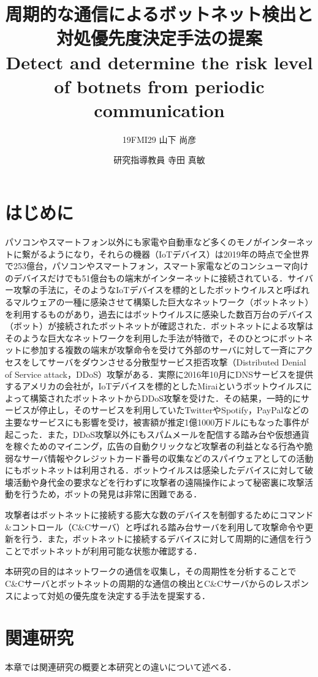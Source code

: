 \documentclass[twocolumn]{ltjsarticle}
\title{
  周期的な通信によるボットネット検出と対処優先度決定手法の提案  \\
  Detect and determine the risk level of botnets from periodic communication
}
\author{19FMI29 山下 尚彦 \and 研究指導教員 寺田 真敏}
\date{}
\begin{document}
\fontsize{9}{9}\selectfont
\maketitle

\section{はじめに}
パソコンやスマートフォン以外にも家電や自動車など多くのモノがインターネットに繋がるようになり，それらの機器（IoTデバイス）は2019年の時点で全世界で253億台，パソコンやスマートフォン，スマート家電などのコンシューマ向けのデバイスだけでも51億台もの端末がインターネットに接続されている\cite{総務省2020IoT:online}．サイバー攻撃の手法に，そのようなIoTデバイスを標的としたボットウイルスと呼ばれるマルウェアの一種に感染させて構築した巨大なネットワーク（ボットネット）を利用するものがあり，過去にはボットウイルスに感染した数百万台のデバイス（ボット）が接続されたボットネットが確認された．ボットネットによる攻撃はそのような巨大なネットワークを利用した手法が特徴で，そのひとつにボットネットに参加する複数の端末が攻撃命令を受けて外部のサーバに対して一斉にアクセスをしてサーバをダウンさせる分散型サービス拒否攻撃（Distributed Denial of Service attack，DDoS）攻撃がある．実際に2016年10月にDNSサービスを提供するアメリカの会社が，IoTデバイスを標的としたMiraiというボットウイルスによって構築されたボットネットからDDoS攻撃を受けた．その結果，一時的にサービスが停止し，そのサービスを利用していたTwitterやSpotify，PayPalなどの主要なサービスにも影響を受け，被害額が推定1億1000万ドルにもなった事件が起こった．また，DDoS攻撃以外にもスパムメールを配信する踏み台や仮想通貨を稼ぐためのマイニング，広告の自動クリックなど攻撃者の利益となる行為や脆弱なサーバ情報やクレジットカード番号の収集などのスパイウェアとしての活動にもボットネットは利用される．ボットウイルスは感染したデバイスに対して破壊活動や身代金の要求などを行わずに攻撃者の遠隔操作によって秘密裏に攻撃活動を行うため，ボットの発見は非常に困難である．

攻撃者はボットネットに接続する膨大な数のデバイスを制御するためにコマンド\&コントロール（C\&Cサーバ）と呼ばれる踏み台サーバを利用して攻撃命令や更新を行う．また，ボットネットに接続するデバイスに対して周期的に通信を行うことでボットネットが利用可能な状態か確認する．

本研究の目的はネットワークの通信を収集し，その周期性を分析することでC\&Cサーバとボットネットの周期的な通信の検出とC\&Cサーバからのレスポンスによって対処の優先度を決定する手法を提案する．

\section{関連研究}
本章では関連研究の概要と本研究との違いについて述べる．
\end{document}
